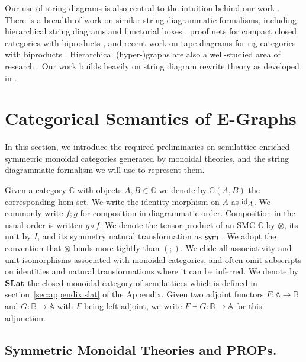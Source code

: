 Our use of string diagrams is also central to the intuition behind our work \cite{Selinger_2010, joyal_geometry_1991}.  
There is a breadth of work on similar string diagrammatic formalisms,  including hierarchical string diagrams \cite{ghica-zanassi2023string} and functorial boxes \cite{mellies_functorial_2006},  proof nets for compact closed categories with biproducts \cite{duncan_generalised_2009}, and recent work on tape diagrams for rig categories with biproducts \cite{bonchi_tape_nodate}. 
Hierarchical (hyper-)graphs are also a well-studied area of research \cite{plump:hierarchical-graphs, montanari:gs-lambda, palacz:hierarchical-transform, Gaducci:hierarchical-graphs, Ghica:hierarchical}. 
Our work builds heavily on string diagram rewrite theory as developed in \cite{bonchi_string_2022-1,bonchi_string_2022-2, bonchi_string_2022-3}. 

\section{Categorical Semantics of E-Graphs}
In this section,  we introduce the required preliminaries on semilattice-enriched symmetric monoidal categories generated by monoidal theories,  and the string diagrammatic formalism we will use to represent them.  

Given a category $\mathbb{C}$  with objects $A,B \in \mathbb{C}$ we denote by $\mathbb{C}(A,B)$ the corresponding hom-set.  
We write the identity morphism on $A$ as $\textsf{id}_A$.  
We commonly write $f;g$ for composition in diagrammatic order.  
Composition in the usual order is written $g \circ f$.  
We denote the tensor product of an SMC $\mathbb{C}$ by $\otimes$,  its unit by $I$, and its symmetry natural transformation as $\textsf{sym}$ \cite{maclane}.  
We adopt the convention that $\otimes$ binds more tightly than $(;\!)$.  
We elide all associativity and unit isomorphisms associated with monoidal categories,  and often omit subscripts on identities and natural transformations where it can be inferred.  
We denote by $\mathbf{SLat}$ the closed monoidal category of semilattices which is defined in section~\ref{sec:appendix:slat} of the Appendix.
Given two adjoint functors $F : \mathbb{A} \to \mathbb{B}$ and $G : \mathbb{B} \to \mathbb{A}$ with $F$ being left-adjoint, we write $F \dashv G : \mathbb{B} \to \mathbb{A}$ for this adjunction.


\subsection{Symmetric Monoidal Theories and PROPs.}

